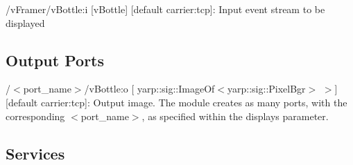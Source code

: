 \begin{DoxyItemize}
\item /v\+Framer/v\+Bottle\+:i \mbox{[}v\+Bottle\mbox{]} \mbox{[}default carrier\+:tcp\mbox{]}\+: Input event stream to be displayed
\end{DoxyItemize}\hypertarget{group__zynqGrabber_outputports_sec}{}\subsection{Output Ports}\label{group__zynqGrabber_outputports_sec}

\begin{DoxyItemize}
\item /$<$port\+\_\+name$>$/v\+Bottle\+:o \mbox{[} yarp\+::sig\+::\+Image\+Of$<$yarp\+::sig\+::\+Pixel\+Bgr$>$ $>$\mbox{]} \mbox{[}default carrier\+:tcp\mbox{]}\+: Output image. The module creates as many ports, with the corresponding $<$port\+\_\+name$>$, as specified within the displays parameter.
\end{DoxyItemize}\hypertarget{group__zynqGrabber_services_sec}{}\subsection{Services}\label{group__zynqGrabber_services_sec}
